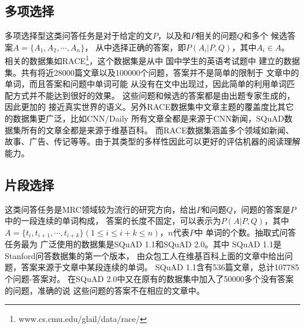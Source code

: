 \subsection{多项选择}
多项选择型这类问答任务是对于给定的文$P$，以及和$P$相关的问题$Q$和多个
候选答案$A=\{A_1,A_2,\cdots,A_n\}$，
从中选择正确的答案，即$P(A_i|P,Q)$，其中$A_i \in A$。
相关的数据集如RACE\footnote{www.cs.cmu.edu/glail/data/race/\label{race}}，这个数据集是从中
国中学生的英语考试题中
建立的数据集。共有将近28000篇文章以及100000个问题，答案并不是简单的限制于
文章中的单词，而且答案和问题中单词可能
从没有在文中出现过，因此简单的利用单词匹配方式并不能达到很好的效果。
这些问题和候选的答案都是由出题专家生成的，因此更加的
接近真实世界的语义。另外RACE数据集中文章主题的覆盖度比其它的数据集更广泛，比如CNN/Daily
所有文章全都是来源于CNN新闻，SQuAD数据集所有的文章全都是来源于维基百科。
而RACE数据集涵盖多个领域如新闻、故事、广告、传记等等。由于其类型的多样性因此可以更好的评估机器的阅读理解
能力。



\subsection{片段选择}
这类问答任务是MRC领域较为流行的研究方向，给出$P$和问题$Q$，问题的答案是$P$中的一段连续的单词构成，
答案的长度不固定，可以表示为$P(A|P,Q)$，其中$A=\{t_i,t_{i+1},\cdots,t_{i+k}\}(1\leq i\leq i+k\leq n)$，$n$代表$P$中
单词的个数。抽取式问答任务最为
广泛使用的数据集是SQuAD 1.1和SQuAD 2.0。其中
SQuAD 1.1是Stanford问答数据集的第一个版本，
由众包工人在维基百科上面的文章中给出问题，答案来源于文章中某段连续的单词。
SQuAD 1.1含有536篇文章，总计107785个问题-答案对。
在SQuAD 2.0中又在原有的数据集中加入了50000多个没有答案的问题，准确的说
这些问题的答案不在相应的文章中。




